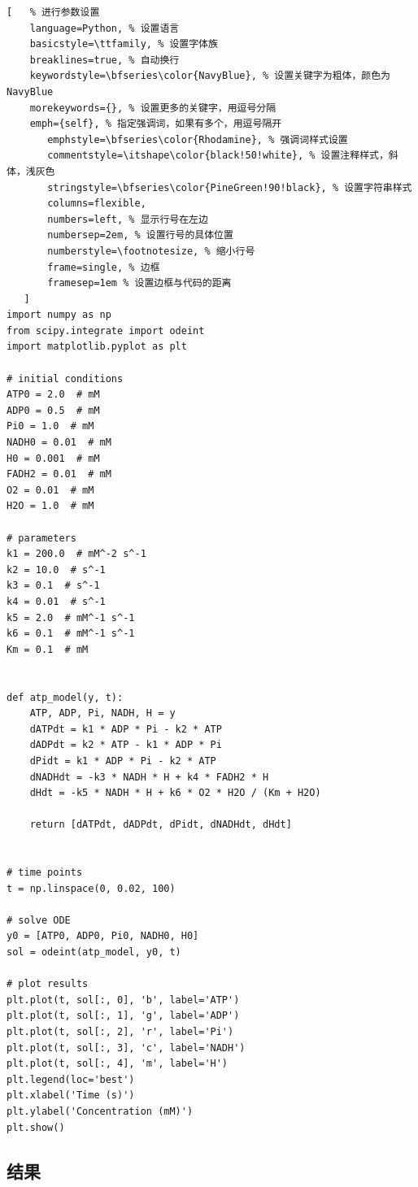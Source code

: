 \documentclass{ctexart}
\begin{document}
\begin{lstlisting}[   % 进行参数设置
    language=Python, % 设置语言
    basicstyle=\ttfamily, % 设置字体族
    breaklines=true, % 自动换行
    keywordstyle=\bfseries\color{NavyBlue}, % 设置关键字为粗体，颜色为 NavyBlue
    morekeywords={}, % 设置更多的关键字，用逗号分隔
    emph={self}, % 指定强调词，如果有多个，用逗号隔开
       emphstyle=\bfseries\color{Rhodamine}, % 强调词样式设置
       commentstyle=\itshape\color{black!50!white}, % 设置注释样式，斜体，浅灰色
       stringstyle=\bfseries\color{PineGreen!90!black}, % 设置字符串样式
       columns=flexible,
       numbers=left, % 显示行号在左边
       numbersep=2em, % 设置行号的具体位置
       numberstyle=\footnotesize, % 缩小行号
       frame=single, % 边框
       framesep=1em % 设置边框与代码的距离
   ]  
import numpy as np
from scipy.integrate import odeint
import matplotlib.pyplot as plt

# initial conditions
ATP0 = 2.0  # mM
ADP0 = 0.5  # mM
Pi0 = 1.0  # mM
NADH0 = 0.01  # mM
H0 = 0.001  # mM
FADH2 = 0.01  # mM
O2 = 0.01  # mM
H2O = 1.0  # mM

# parameters
k1 = 200.0  # mM^-2 s^-1
k2 = 10.0  # s^-1
k3 = 0.1  # s^-1
k4 = 0.01  # s^-1
k5 = 2.0  # mM^-1 s^-1
k6 = 0.1  # mM^-1 s^-1
Km = 0.1  # mM


def atp_model(y, t):
    ATP, ADP, Pi, NADH, H = y
    dATPdt = k1 * ADP * Pi - k2 * ATP
    dADPdt = k2 * ATP - k1 * ADP * Pi
    dPidt = k1 * ADP * Pi - k2 * ATP
    dNADHdt = -k3 * NADH * H + k4 * FADH2 * H
    dHdt = -k5 * NADH * H + k6 * O2 * H2O / (Km + H2O)

    return [dATPdt, dADPdt, dPidt, dNADHdt, dHdt]


# time points
t = np.linspace(0, 0.02, 100)

# solve ODE
y0 = [ATP0, ADP0, Pi0, NADH0, H0]
sol = odeint(atp_model, y0, t)

# plot results
plt.plot(t, sol[:, 0], 'b', label='ATP')
plt.plot(t, sol[:, 1], 'g', label='ADP')
plt.plot(t, sol[:, 2], 'r', label='Pi')
plt.plot(t, sol[:, 3], 'c', label='NADH')
plt.plot(t, sol[:, 4], 'm', label='H')
plt.legend(loc='best')
plt.xlabel('Time (s)')
plt.ylabel('Concentration (mM)')
plt.show()

\end{lstlisting}



\subsection{结果}
\end{document}
